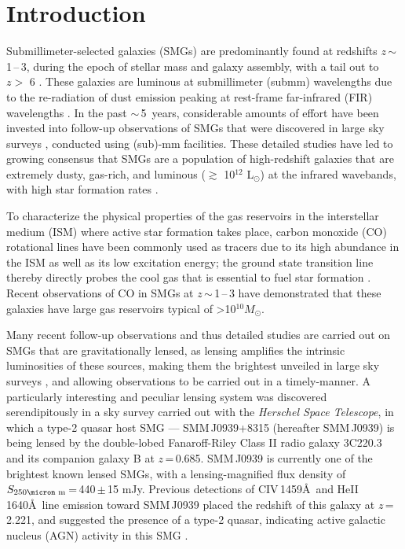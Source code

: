 \documentclass[twocolumn,apj,numberedappendix]{emulateapj}
\newcommand{\Msun}{\mbox{$M_{\odot}$}}
\newcommand{\Lsun}{\mbox{L$_{\odot}$}}
\newcommand{\eg}{{\sl e.g.,~}}
\newcommand{\pmOne}{\mbox{$^{-1}$}}
\begin{document}
\section{Introduction}\label{sec:intro}
Submillimeter-selected galaxies (SMGs) are predominantly found at redshifts $z$\,$\sim$\,1\,--\,3, during the epoch of stellar mass and 
galaxy assembly, with a tail out to $z>$ 6 \citep{Riechers13a}. 
These galaxies are luminous at submillimeter (submm) wavelengths due to the re-radiation of dust emission peaking at 
rest-frame far-infrared (FIR) wavelengths \citep{blain02a}. 
In the past $\sim$\,5~years, considerable amounts of effort have been invested into follow-up observations of SMGs that were 
discovered in large sky surveys \citep[\eg H-ATLAS, HerMES; ][]{Eales10a,Oliver12a}, conducted using (sub)-mm facilities. These detailed studies have led to growing consensus that SMGs are a population of high-redshift galaxies that are extremely dusty, gas-rich, 
  and luminous ($\gtrsim$ 10$^{12}$ \Lsun) at the infrared wavebands, with high star formation rates \citep[$\gtrsim $ 500 \Msun yr\pmOne; \eg][]{Lagache05a}.
  
  To characterize the physical properties of the gas reservoirs in the interstellar medium (ISM) where active star formation takes place, carbon monoxide (CO) rotational lines have been commonly used as tracers due to its high abundance in the ISM as well as its low excitation energy; the ground state transition line thereby directly probes the cool gas that is essential to fuel star formation \citep[See \eg][]{Carilli13a}. Recent observations of CO in SMGs at $z$\,$\sim$\,1\,--\,3 have demonstrated that these galaxies have large gas reservoirs typical of \textgreater 10$^{10}$\Msun \citep[\eg][]{Riechers11c,Riechers11d,Ivison11a,Bothwell13a}. 

Many recent follow-up observations and thus detailed studies are carried out on SMGs that are gravitationally lensed,
 as lensing amplifies the intrinsic luminosities of these sources, making them the brightest unveiled in large sky surveys \citep{Negrello10a,Vieira10a,Oliver12a}, and allowing observations to be carried out in a timely-manner.
A particularly interesting and peculiar lensing system was discovered serendipitously in a sky survey carried out with the {\it Herschel Space Telescope}, in which 
a type-2 quasar host SMG --- SMM\,J0939+8315 (hereafter SMM\,J0939) is being lensed by the double-lobed Fanaroff-Riley 
Class II \citep*[FR-II; ][]{Fanaroff74} radio galaxy 3C220.3 and its
companion galaxy B at $z$\,=\,0.685.
SMM\,J0939 is currently one of the brightest known lensed
SMGs, with a lensing-magnified flux density of $S_\textrm{250\micron m}$\,=\,440\,$\pm$\,15 mJy. 
Previous detections of CIV\,1459\AA\
 and HeII\,1640\AA\ line emission toward SMM\,J0939 
 placed the redshift of this galaxy at $z$\,=\,2.221, and suggested the presence of a type-2 quasar,  
indicating active galactic nucleus (AGN) activity in this SMG \citep[hereafter H14]{Haas14}. 
\end{document}
